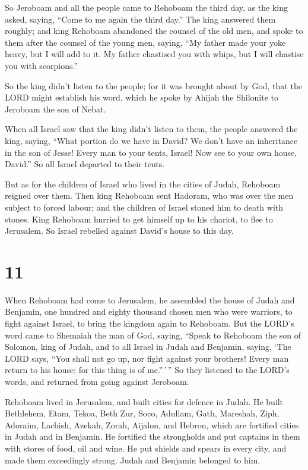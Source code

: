 So Jeroboam and all the people came to Rehoboam the third
day, as the king asked, saying, ``Come to me again the third day.''
 The king answered them roughly; and king Rehoboam
abandoned the counsel of the old men,  and spoke to them
after the counsel of the young men, saying, ``My father made your yoke
heavy, but I will add to it. My father chastised you with whips, but I
will chastise you with scorpions.''

 So the king didn't listen to the people; for it was
brought about by God, that the LORD might establish his word, which he
spoke by Ahijah the Shilonite to Jeroboam the son of Nebat.

 When all Israel saw that the king didn't listen to them,
the people answered the king, saying, ``What portion do we have in
David? We don't have an inheritance in the son of Jesse! Every man to
your tents, Israel! Now see to your own house, David.'' So all Israel
departed to their tents.

 But as for the children of Israel who lived in the cities
of Judah, Rehoboam reigned over them.  Then king Rehoboam
sent Hadoram, who was over the men subject to forced labour; and the
children of Israel stoned him to death with stones. King Rehoboam
hurried to get himself up to his chariot, to flee to Jerusalem.
 So Israel rebelled against David's house to this day.

\hypertarget{section-10}{%
\section{11}\label{section-10}}

 When Rehoboam had come to Jerusalem, he assembled the house
of Judah and Benjamin, one hundred and eighty thousand chosen men who
were warriors, to fight against Israel, to bring the kingdom again to
Rehoboam.  But the LORD's word came to Shemaiah the man of
God, saying,  ``Speak to Rehoboam the son of Solomon, king
of Judah, and to all Israel in Judah and Benjamin, saying, 
`The LORD says, ``You shall not go up, nor fight against your brothers!
Every man return to his house; for this thing is of me.''\,'\,'' So they
listened to the LORD's words, and returned from going against Jeroboam.

 Rehoboam lived in Jerusalem, and built cities for defence
in Judah.  He built Bethlehem, Etam, Tekoa, 
Beth Zur, Soco, Adullam,  Gath, Mareshah, Ziph, 
Adoraim, Lachish, Azekah,  Zorah, Aijalon, and Hebron,
which are fortified cities in Judah and in Benjamin.  He
fortified the strongholds and put captains in them with stores of food,
oil and wine.  He put shields and spears in every city, and
made them exceedingly strong. Judah and Benjamin belonged to him.

